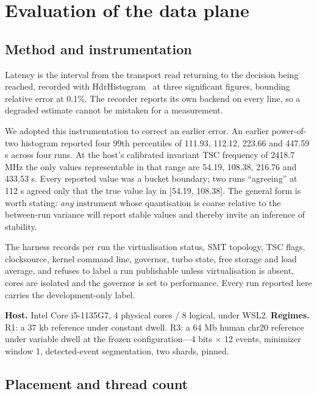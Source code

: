 \documentclass[conference]{IEEEtran}
\begin{document}
\section{Evaluation of the data plane}
\label{sec:eval}

\subsection{Method and instrumentation}

Latency is the interval from the transport read returning to the decision being reached,
recorded with HdrHistogram~\cite{hdrhistogram} at three significant figures, bounding relative
error at 0.1\%. The recorder reports its own backend on every line, so a degraded estimate
cannot be mistaken for a measurement.

We adopted this instrumentation to correct an earlier error. An earlier power-of-two histogram reported four 99th
percentiles of 111.93, 112.12, 223.66 and 447.59 \textmu{}s across four runs. At the host's calibrated
invariant TSC frequency of 2418.7 MHz the only values representable in that range are 54.19,
108.38, 216.76 and 433.53 \textmu{}s. Every reported value was a bucket boundary; two runs ``agreeing''
at 112 \textmu{}s agreed only that the true value lay in [54.19, 108.38]. The general form is worth
stating: \emph{any} instrument whose quantisation is coarse relative to the between-run
variance will report stable values and thereby invite an inference of stability.

The harness records per run the virtualisation status, SMT topology, TSC flags, clocksource,
kernel command line, governor, turbo state, free storage and load average, and refuses to label
a run publishable unless virtualisation is absent, cores are isolated and the governor is set to
performance. Every run reported here carries the development-only label.

\textbf{Host.} Intel Core i5-1135G7, 4 physical cores / 8 logical, under WSL2.
\textbf{Regimes.} R1: a 37 kb reference under constant dwell. R3: a 64 Mb human chr20 reference
under variable dwell at the frozen configuration---4 bits $\times$ 12 events,
minimizer~\cite{minimizers} window
1, detected-event segmentation, two shards, pinned.

\subsection{Placement and thread count}
\end{document}

